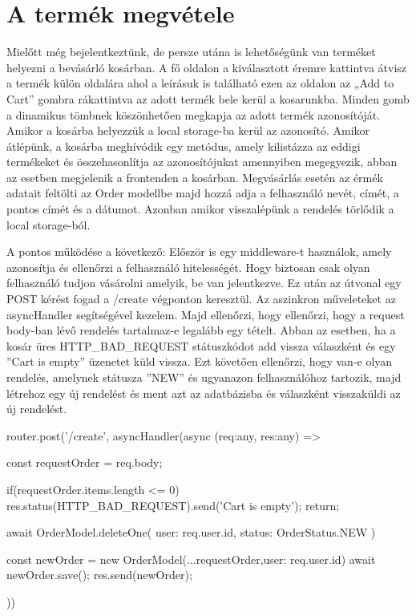 \section{A termék megvétele}
Mielőtt még bejelentkeztünk, de persze utána is lehetőségünk van terméket helyezni a bevásárló kosárban. A fő oldalon a kiválasztott éremre kattintva átvisz a termék külön oldalára ahol a leírásuk is található ezen az oldalon az „Add to Cart” gombra rákattintva az adott termék bele kerül a kosarunkba. Minden gomb a dinamikus tömbnek köszönhetően megkapja az adott termék azonosítóját. Amikor a kosárba helyezzük a local storage-ba kerül az azonosító. Amikor átlépünk, a kosárba meghívódik egy metódus, amely kilistázza az eddigi termékeket és összehasonlítja az azonosítójukat amennyiben megegyezik, abban az esetben megjelenik a frontenden a kosárban. Megvásárlás esetén az érmék adatait feltölti az Order modellbe majd hozzá adja a felhasználó nevét, címét, a pontos címét és a dátumot. Azonban amikor visszalépünk a rendelés törlődik a local storage-ból.

A pontos működése a következő: Először is egy middleware-t használok, amely azonosítja és ellenőrzi a felhasználó hitelességét. Hogy biztosan csak olyan felhasználó tudjon vásárolni amelyik, be van jelentkezve. Ez után az útvonal egy POST kérést fogad a /create végponton keresztül. Az aszinkron műveleteket az asyncHandler segítségével kezelem. Majd ellenőrzi, hogy ellenőrzi, hogy a request body-ban lévő rendelés tartalmaz-e legalább egy tételt. Abban az esetben, ha a kosár üres HTTP\_BAD\_REQUEST státuszkódot add vissza válaszként és egy ”Cart is empty” üzenetet küld vissza. Ezt követően ellenőrzi, hogy van-e olyan rendelés, amelynek státusza ”NEW” és ugyanazon felhasználóhoz tartozik, majd létrehoz egy új rendelést és ment azt az adatbázisba és válaszként visszaküldi az új rendelést. 

\begin{python}[caption={Rendelés létrehozása},captionpos=b]
router.post('/create',
asyncHandler(async (req:any, res:any) => {
    const requestOrder = req.body;

    if(requestOrder.items.length <= 0){
        res.status(HTTP_BAD_REQUEST).send('Cart is empty');
        return;
    }

    await OrderModel.deleteOne({
        user: req.user.id,
        status: OrderStatus.NEW
    })

    const newOrder = new OrderModel({...requestOrder,user: req.user.id})
    await newOrder.save();
    res.send(newOrder);

}))
\end{python}

